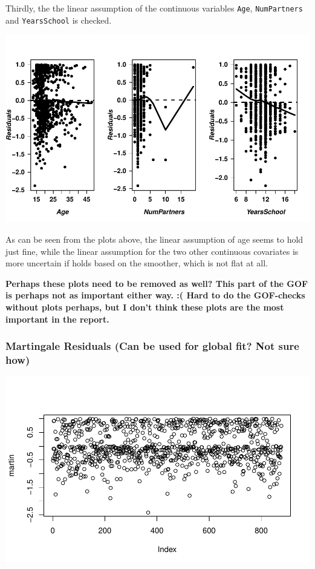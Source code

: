 \documentclass[
]{article}
\begin{document}
Thirdly, the the linear assumption of the continuous variables \texttt{Age}, \texttt{NumPartners} and \texttt{YearsSchool} is checked.

\includegraphics{practical_files/figure-latex/unnamed-chunk-8-1.pdf}

As can be seen from the plots above, the linear assumption of age seems to hold just fine, while the linear assumption for the two other continuous covariates is more uncertain if holds based on the smoother, which is not flat at all.

\textbf{Perhaps these plots need to be removed as well? This part of the GOF is perhaps not as important either way. :( Hard to do the GOF-checks without plots perhaps, but I don't think these plots are the most important in the report.}

\hypertarget{martingale-residuals-can-be-used-for-global-fit-not-sure-how}{%
\subsubsection{Martingale Residuals (Can be used for global fit? Not sure how)}\label{martingale-residuals-can-be-used-for-global-fit-not-sure-how}}

\includegraphics{practical_files/figure-latex/unnamed-chunk-9-1.pdf}
\end{document}

